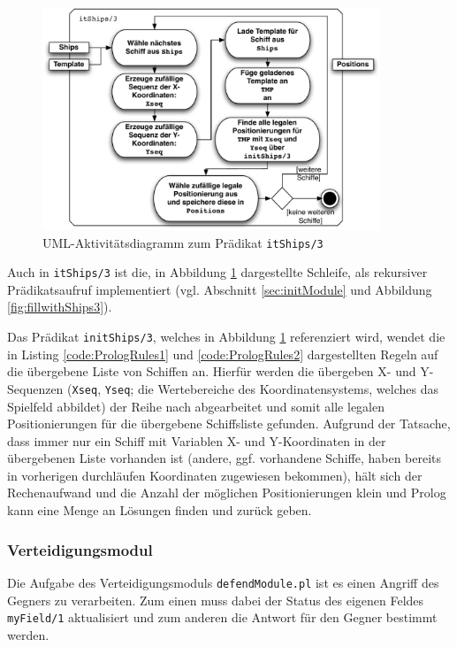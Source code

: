 	\begin{figure}[H] %
		\centering
		\includegraphics[width=0.9\textwidth]{images/itShips3.pdf}
		\caption{UML-Aktivitätsdiagramm zum Prädikat \texttt{itShips/3}}
		\label{fig:itShips}
	\end{figure}
	Auch in \texttt{itShips/3} ist die, in Abbildung \ref{fig:itShips} dargestellte Schleife, als rekursiver Prädikatsaufruf implementiert 
	(vgl. Abschnitt \ref{sec:initModule} und Abbildung \ref{fig:fillwithShips3}).
	
	Das Prädikat \texttt{initShips/3}, welches in Abbildung \ref{fig:itShips} referenziert wird, wendet die in Listing \ref{code:PrologRules1} 
	und \ref{code:PrologRules2} dargestellten 
	Regeln auf die übergebene Liste von Schiffen an. Hierfür werden die übergeben X- und Y-Sequenzen (\texttt{Xseq}, \texttt{Yseq}; die Wertebereiche des Koordinatensystems, 
	welches das Spielfeld abbildet) der Reihe nach abgearbeitet und somit alle legalen Positionierungen für die übergebene Schiffsliste gefunden. Aufgrund der 
	Tatsache, dass immer nur ein Schiff mit Variablen X- und Y-Koordinaten in der übergebenen Liste vorhanden ist (andere, ggf. vorhandene Schiffe, haben bereits 
	in vorherigen durchläufen Koordinaten zugewiesen bekommen), hält sich der Rechenaufwand und die Anzahl der möglichen Positionierungen klein und Prolog kann 
	eine Menge an Lösungen finden und zurück geben.
\subsubsection{Verteidigungsmodul} \label{sec:defendModule}
	Die Aufgabe des Verteidigungsmoduls \texttt{defendModule.pl} ist es einen Angriff des Gegners zu verarbeiten.
	Zum einen muss dabei der Status des eigenen Feldes \texttt{myField/1} aktualisiert 
	und zum anderen die Antwort für den Gegner bestimmt werden.
	
